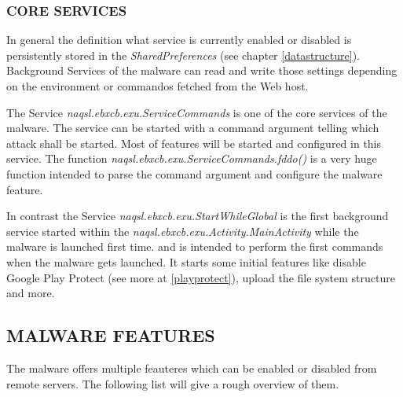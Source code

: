 \documentclass[10pt,titlepage]{article}
\begin{document}
\subsubsection{CORE SERVICES}\label{featureselection}

In general the definition what service is currently enabled or disabled is persistently stored in the \textit{SharedPreferences} (see chapter \ref{datastructure}). Background Services of the malware can read and write those settings depending on the environment or commandos fetched from the Web host.

The Service \textit{naqsl.ebxcb.exu.ServiceCommands} is one of the core services of the malware. The service can be started with a command argument telling which attack shall be started. Most of features will be started and configured in this service. The function \textit{naqsl.ebxcb.exu.ServiceCommands.fddo()} is a very huge function intended to parse the command argument and configure the malware feature.

In contrast the Service \textit{naqsl.ebxcb.exu.StartWhileGlobal} is the first background service started within the \textit{naqsl.ebxcb.exu.Activity.MainActivity} while the malware is launched first time. and is intended to perform the first commands when the malware gets launched. It starts some initial features like disable Google Play Protect (see more at \ref{playprotect}), upload the file system structure and more.

\newpage
\subsection{MALWARE FEATURES}
The malware offers multiple feauteres which can be enabled or disabled from remote servers. The following list will give a rough overview of them.
\end{document}
